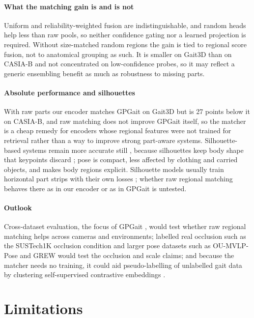 \documentclass[review,12pt]{elsarticle}
\begin{document}
\paragraph{What the matching gain is and is not}
Uniform and reliability-weighted fusion are indistinguishable, and random
heads help less than raw pools, so neither confidence gating nor a learned
projection is required. Without size-matched random regions the gain is tied to
regional score fusion, not to anatomical grouping as such. It is smaller on
Gait3D than on CASIA-B and not concentrated on low-confidence probes, so it may
reflect a generic ensembling benefit as much as robustness to missing parts.

\paragraph{Absolute performance and silhouettes}
With raw parts our encoder matches GPGait on Gait3D but is 27 points below it
on CASIA-B, and raw matching does not improve GPGait itself, so the matcher is a
cheap remedy for encoders whose regional features were not trained for
retrieval rather than a way to improve strong part-aware systems.
Silhouette-based systems remain more accurate still
\cite{chao2019gaitset,fan2020gaitpart,lin2021gaitgl,fan2022opengait}, because
silhouettes keep body shape that keypoints discard \cite{fu2023gpgait}; pose is
compact, less affected by clothing and carried objects, and makes body regions
explicit. Silhouette models usually train horizontal part strips with their own
losses \cite{chao2019gaitset,fan2020gaitpart}; whether raw regional matching
behaves there as in our encoder or as in GPGait is untested.

\paragraph{Outlook}
Cross-dataset evaluation, the focus of GPGait \cite{fu2023gpgait}, would test
whether raw regional matching helps across cameras and environments; labelled
real occlusion such as the SUSTech1K occlusion condition \cite{shen2023lidargait}
and larger pose datasets such as OU-MVLP-Pose and GREW
\cite{an2020oumvlppose,zhu2021grew} would test the occlusion and scale claims;
and because the matcher needs no training, it could aid pseudo-labelling of
unlabelled gait data by clustering self-supervised contrastive embeddings
\cite{cosma2026gaitpt}.

\section{Limitations}
\label{sec:limitations}
\end{document}
